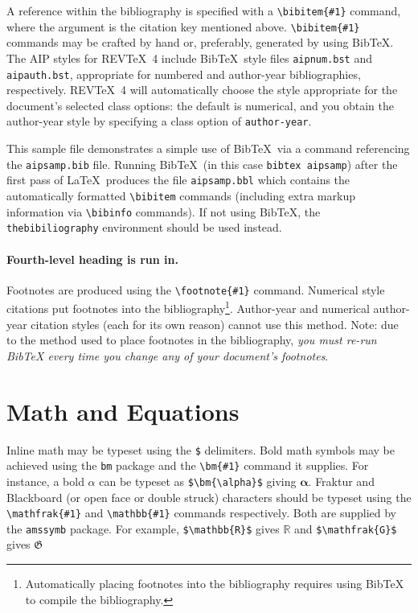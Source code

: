 \documentclass[%
 aip,
 jmp,%
 amsmath,amssymb,
 reprint,%
]{revtex4-1}
\begin{document}
A reference within the bibliography is specified with a \verb+\bibitem{#1}+ command,
where the argument is the citation key mentioned above. 
\verb+\bibitem{#1}+ commands may be crafted by hand or, preferably,
generated by using Bib\TeX. 
The AIP styles for REV\TeX~4 include Bib\TeX\ style files
\verb+aipnum.bst+ and \verb+aipauth.bst+, appropriate for
numbered and author-year bibliographies,
respectively. 
REV\TeX~4 will automatically choose the style appropriate for 
the document's selected class options: the default is numerical, and
you obtain the author-year style by specifying a class option of \verb+author-year+.

This sample file demonstrates a simple use of Bib\TeX\ 
via a \verb++ command referencing the \verb+aipsamp.bib+ file.
Running Bib\TeX\ (in this case \texttt{bibtex
aipsamp}) after the first pass of \LaTeX\ produces the file
\verb+aipsamp.bbl+ which contains the automatically formatted
\verb+\bibitem+ commands (including extra markup information via
\verb+\bibinfo+ commands). If not using Bib\TeX, the
\verb+thebibiliography+ environment should be used instead.

\paragraph{Fourth-level heading is run in.}%
Footnotes are produced using the \verb+\footnote{#1}+ command. 
Numerical style citations put footnotes into the 
bibliography\footnote{Automatically placing footnotes into the bibliography requires using BibTeX to compile the bibliography.}.
Author-year and numerical author-year citation styles (each for its own reason) cannot use this method. 
Note: due to the method used to place footnotes in the bibliography, \emph{you
must re-run BibTeX every time you change any of your document's
footnotes}. 

\section{Math and Equations}
Inline math may be typeset using the \verb+$+ delimiters. Bold math
symbols may be achieved using the \verb+bm+ package and the
\verb+\bm{#1}+ command it supplies. For instance, a bold $\alpha$ can
be typeset as \verb+$\bm{\alpha}$+ giving $\bm{\alpha}$. Fraktur and
Blackboard (or open face or double struck) characters should be
typeset using the \verb+\mathfrak{#1}+ and \verb+\mathbb{#1}+ commands
respectively. Both are supplied by the \texttt{amssymb} package. For
example, \verb+$\mathbb{R}$+ gives $\mathbb{R}$ and
\verb+$\mathfrak{G}$+ gives $\mathfrak{G}$
\end{document}
